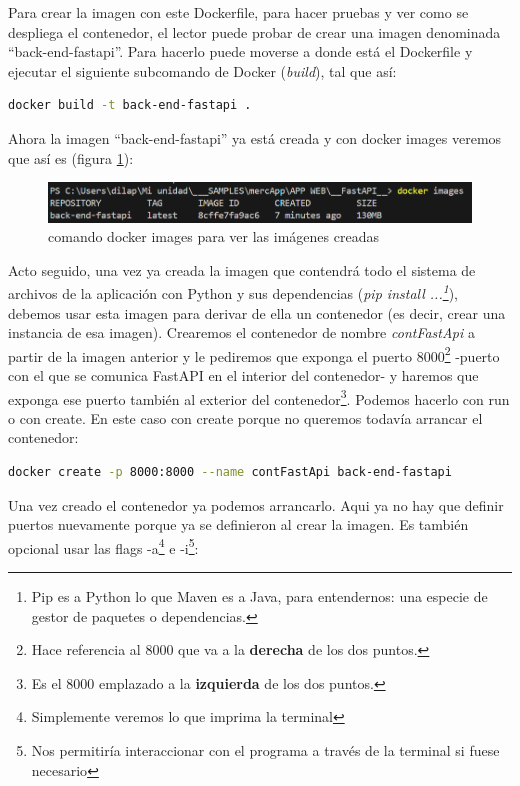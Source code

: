 \documentclass[a4paper,12pt]{report}
\begin{document}
	Para crear la imagen con este Dockerfile, para hacer pruebas y ver como se despliega el contenedor, el lector puede probar de crear una imagen denominada ``back-end-fastapi''. Para hacerlo puede moverse a donde está el Dockerfile y ejecutar el siguiente subcomando de Docker (\textit{build}), tal que así:
	
	\begin{lstlisting}[language=bash]
		docker build -t back-end-fastapi .
	\end{lstlisting}
	
		Ahora la imagen ``back-end-fastapi'' ya está creada y con docker images veremos que así es (figura \ref{fig:dockerimages}):
	\FloatBarrier
	\begin{figure}[H]
		\centering
		\caption{comando docker images para ver las imágenes creadas}
		\label{fig:dockerimages}
		\includegraphics[width=1\linewidth]{img/dockerImages}
	\end{figure}
	\FloatBarrier
	

	
	Acto seguido, una vez ya creada la imagen que contendrá todo el sistema de archivos de la aplicación con Python y sus dependencias (\textit{pip install ...\footnote{Pip es a Python lo que Maven es a Java, para entendernos: una especie de gestor de paquetes o dependencias.}}), debemos usar esta imagen para derivar de ella un contenedor (es decir, crear una instancia de esa imagen). Crearemos el contenedor de nombre \textit{contFastApi} a partir de la imagen anterior y le pediremos que exponga el puerto 8000\footnote{Hace referencia al 8000 que va a la \textbf{derecha} de los dos puntos.} -puerto con el que se comunica FastAPI en el interior del contenedor- y haremos que exponga ese puerto también al exterior del contenedor\footnote{Es el 8000 emplazado a la \textbf{izquierda} de los dos puntos.}. Podemos hacerlo con run o con create. En este caso con create porque no queremos todavía arrancar el contenedor:
	
	\begin{lstlisting}[language=bash]
docker create -p 8000:8000 --name contFastApi back-end-fastapi
	\end{lstlisting}

	
	Una vez creado el contenedor ya podemos arrancarlo. Aqui ya no hay que definir puertos nuevamente porque ya se definieron al crear la imagen. Es también opcional usar las flags -a\footnote{Simplemente veremos lo que imprima la terminal} e -i\footnote{Nos permitiría interaccionar con el programa a través de la terminal si fuese necesario}:
	
\end{document}
